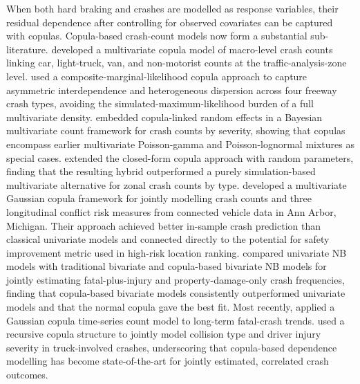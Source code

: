 \documentclass[letterpaper,8pt]{extarticle}  %
\begin{document}
\begin{doublespacing}
\begin{linenumbers}
When both hard braking and crashes are modelled as response variables, their residual dependence
after controlling for observed covariates can be captured with copulas. Copula-based crash-count
models now form a substantial sub-literature. \citet{Yasmin2018AModel} developed a multivariate
copula model of macro-level crash counts linking car, light-truck, van, and non-motorist counts at
the traffic-analysis-zone level. \citet{Mothafer2018ATypes} used a composite-marginal-likelihood
copula approach to capture asymmetric interdependence and heterogeneous dispersion across four
freeway crash types, avoiding the simulated-maximum-likelihood burden of a full multivariate
density. \citet{Park2021BayesianCopulas} embedded copula-linked random effects in a Bayesian
multivariate count framework for crash counts by severity, showing that copulas encompass earlier
multivariate Poisson-gamma and Poisson-lognormal mixtures as special cases.
\citet{Bhowmik2021ExploringModeling} extended the closed-form copula approach with random
parameters, finding that the resulting hybrid outperformed a purely simulation-based multivariate
alternative for zonal crash counts by type. \citet{Yang2021Copula-basedMargins} developed a
multivariate Gaussian copula framework for jointly modelling crash counts and three longitudinal
conflict risk measures from connected vehicle data in Ann Arbor, Michigan. Their approach achieved
better in-sample crash prediction than classical univariate models and connected directly to the
potential for safety improvement metric used in high-risk location ranking.
\citet{Ahmad2023Copula-basedVehicles} compared univariate NB models with traditional bivariate and
copula-based bivariate NB models for jointly estimating fatal-plus-injury and property-damage-only
crash frequencies, finding that copula-based bivariate models consistently outperformed univariate
models and that the normal copula gave the best fit. Most recently, \citet{Lian2025InfluenceProcess}
applied a Gaussian copula time-series count model to long-term fatal-crash trends.
\citet{Song2026JointApproach} used a recursive copula structure to jointly model collision type and
driver injury severity in truck-involved crashes, underscoring that copula-based dependence
modelling has become state-of-the-art for jointly estimated, correlated crash outcomes.



\end{linenumbers}
\end{doublespacing}
\end{document}
